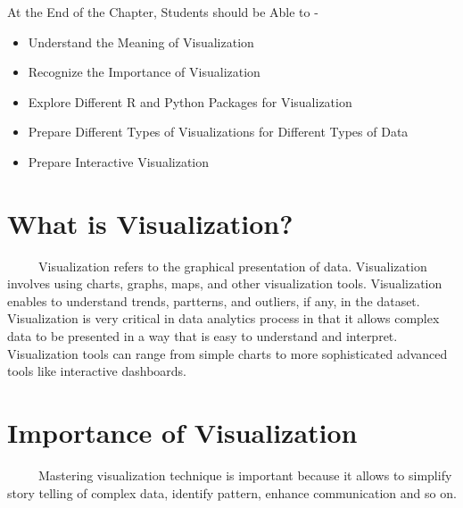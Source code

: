 \documentclass[
  letterpaper,
  DIV=11,
  numbers=noendperiod]{scrreprt}
\begin{document}
\begin{tcolorbox}[enhanced jigsaw, arc=.35mm, bottomrule=.15mm, bottomtitle=1mm, breakable, colback=white, colbacktitle=quarto-callout-note-color!10!white, colframe=quarto-callout-note-color-frame, coltitle=black, left=2mm, leftrule=.75mm, opacityback=0, opacitybacktitle=0.6, rightrule=.15mm, title=\textcolor{quarto-callout-note-color}{\faInfo}\hspace{0.5em}{Learning Objectives}, titlerule=0mm, toprule=.15mm, toptitle=1mm]

At the End of the Chapter, Students should be Able to -

\begin{itemize}
\item
  Understand the Meaning of Visualization
\item
  Recognize the Importance of Visualization
\item
  Explore Different R and Python Packages for Visualization
\item
  Prepare Different Types of Visualizations for Different Types of Data
\item
  Prepare Interactive Visualization
\end{itemize}

\end{tcolorbox}

\section{What is Visualization?}\label{what-is-visualization}

~~~~~Visualization refers to the graphical presentation of data.
Visualization involves using charts, graphs, maps, and other
visualization tools. Visualization enables to understand trends,
partterns, and outliers, if any, in the dataset. Visualization is very
critical in data analytics process in that it allows complex data to be
presented in a way that is easy to understand and interpret.
Visualization tools can range from simple charts to more sophisticated
advanced tools like interactive dashboards.

\section{Importance of Visualization}\label{importance-of-visualization}

~~~~~Mastering visualization technique is important because it allows to
simplify story telling of complex data, identify pattern, enhance
communication and so on.
\end{document}
